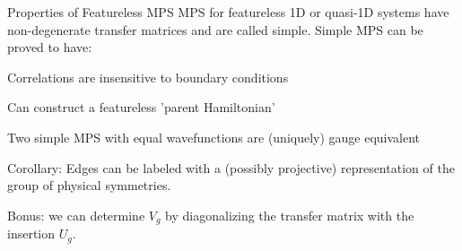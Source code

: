 \begin{frame}{Properties of Featureless MPS}
\vskip-1.5cm
MPS for featureless 1D or quasi-1D systems have non-degenerate transfer matrices and are called simple. Simple MPS can be proved to have:

\bi 
\item Correlations are insensitive to boundary conditions
\item Can construct a featureless 'parent Hamiltonian' 
\item Two simple MPS with equal wavefunctions are (uniquely) gauge equivalent
\item Corollary: Edges can be labeled with a (possibly projective) representation of the group of physical symmetries.

\begin{figure}
\scalebox{1}{
            
            }
\end{figure}

\item Bonus: we can determine $V_g$ by diagonalizing the transfer matrix with the insertion $U_g$. 

\ei 

\end{frame}